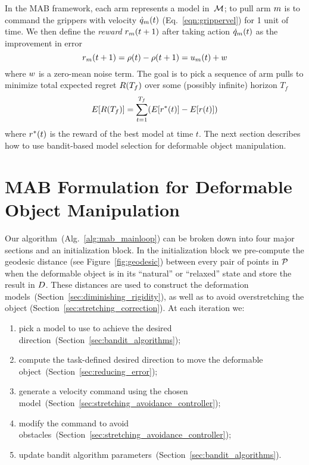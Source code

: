 In the MAB framework, each arm represents a model in~$\mathcal{M}$; to pull arm $m$ is to command the grippers with velocity $\dot{q}_m(t)$ (Eq.~\ref{eqn:grippervel}) for 1 unit of time. We then define the \textit{reward} $r_m(t+1)$ after taking action $\dot{q}_m(t)$ as the improvement in error
\begin{equation}
    r_m(t+1) = \rho(t) - \rho(t+1) = u_m(t) + w
    \label{eqn:observedreward}
\end{equation}
where $w$ is a zero-mean noise term. The goal is to pick a sequence of arm pulls to minimize total expected regret $R(T_f)$ over some (possibly infinite) horizon $T_f$
\begin{equation}
    E[R(T_f)] = \sum_{t=1}^{T_f} (E[r^*(t)] - E[r(t)])
    \label{eqn:totalregret}
\end{equation}
where $r^*(t)$ is the reward of the best model at time $t$. The next section describes how to use bandit-based model selection for deformable object manipulation.


\section{MAB Formulation for Deformable Object Manipulation}

Our algorithm~(Alg.~\ref{alg:mab_mainloop}) can be broken down into four major sections and an initialization block. In the initialization block we pre-compute the geodesic distance (see Figure~\ref{fig:geodesic}) between every pair of points in $\mathcal{P}$ when the deformable object is in its ``natural'' or ``relaxed'' state and store the result in $D$. These distances are used to construct the deformation models~(Section~\ref{sec:diminishing_rigidity}), as well as to avoid overstretching the object (Section~\ref{sec:stretching_correction}).
At each iteration we: 
\begin{enumerate}
    \item pick a model to use to achieve the desired direction~(Section~\ref{sec:bandit_algorithms}); 
    \item compute the task-defined desired direction to move the deformable object~(Section~\ref{sec:reducing_error}); 
    \item generate a velocity command using the chosen model~(Section~\ref{sec:stretching_avoidance_controller}); 
    \item modify the command to avoid obstacles~(Section~\ref{sec:stretching_avoidance_controller});
    \item update bandit algorithm parameters~(Section~\ref{sec:bandit_algorithms}).
\end{enumerate}

